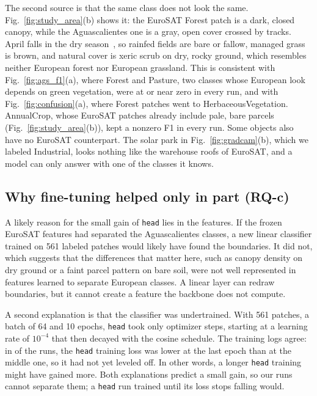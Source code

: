 The second source is that the same class does not look the same. Fig.~\ref{fig:study_area}(b)
shows it: the EuroSAT Forest patch is a dark, closed canopy, while the Aguascalientes one is a
gray, open cover crossed by tracks. April falls in the dry season~\cite{inagua2022planhidrico}, so rainfed fields are bare
or fallow, managed grass is brown, and natural cover is xeric scrub on dry, rocky ground, which
resembles neither European forest nor European grassland. This is consistent with
Fig.~\ref{fig:ags_f1}(a), where Forest and Pasture, two classes whose European look depends on
green vegetation, were at or near zero in every run, and with Fig.~\ref{fig:confusion}(a), where
Forest patches went to HerbaceousVegetation. AnnualCrop, whose EuroSAT patches already include
pale, bare parcels (Fig.~\ref{fig:study_area}(b)), kept a nonzero F1 in every run. Some objects
also have no EuroSAT counterpart. The solar park in Fig.~\ref{fig:gradcam}(b), which we labeled
Industrial, looks nothing like the warehouse roofs of EuroSAT, and a model can only answer with
one of the classes it knows.

\subsection{Why fine-tuning helped only in part (RQ-c)}

A likely reason for the small gain of \texttt{head} lies in the features. If the frozen EuroSAT
features had separated the Aguascalientes classes, a new linear classifier trained on 561
labeled patches would likely have found the boundaries. It did not, which suggests that the
differences that matter here, such as canopy density on dry ground or a faint parcel pattern on
bare soil, were not well represented in features learned to separate European classes. A
linear layer can redraw boundaries, but it cannot create a feature the backbone does not
compute.

A second explanation is that the classifier was undertrained. With 561 patches, a batch of 64
and 10 epochs, \texttt{head} took only \FineTuneSteps{} optimizer steps, starting at a learning
rate of $10^{-4}$ that then decayed with the cosine schedule. The training logs agree: in
\HeadLossFallingRuns{} of the \NumRuns{} runs, the \texttt{head} training loss was lower at the
last epoch than at the middle one, so it had not yet leveled off. In other words, a longer
\texttt{head} training might have gained more. Both explanations predict a small gain, so our
runs cannot separate them; a \texttt{head} run trained until its loss stops falling would.

